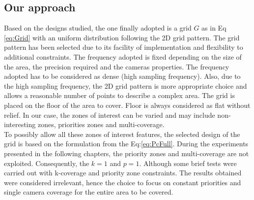 \begin{landscape}
\begin{table}[!h]
 \caption{Sum-up of the grid map.}\label{tab:mapSumUp}
\end{table}	
\end{landscape}
 
\subsection{Our approach}
 Based on the designs studied, the one finally adopted is a grid $G$ as in Eq \ref{eq:Grid} with an uniform distribution following the 2D grid pattern. The grid pattern has been selected due to its facility of implementation and  flexibility to additional constraints.
  The frequency adopted is fixed depending on the size of the area, the precision required and the cameras properties. The frequency adopted has to be considered as dense (high sampling frequency).
  Also, due to the high sampling frequency, the 2D grid pattern is more appropriate choice and allows a reasonable number of points to describe a complex area. 
  The grid is placed on the floor of the area to cover. Floor is always considered as flat without relief.
  In our case, the zones of interest can be varied and may include non-interesting zones, priorities zones  and  multi-coverage. \\
  To possibly allow all these zones of interest features, the selected design of the grid is based on the formulation from the Eq:\ref{eq:PcFull}. During the experiments presented in the following  chapters, the priority zones and multi-coverage are not exploited. Consequently, the $k=1$ and $p=1$.  Although some brief tests were carried out with k-coverage and priority zone constraints. The results obtained were considered irrelevant, hence the choice to focus on constant priorities and single camera coverage for the entire area to be covered.\\

